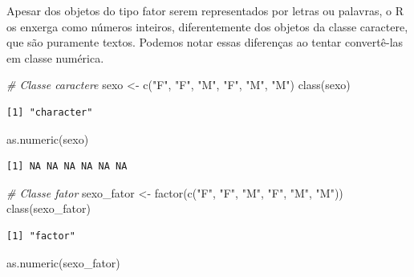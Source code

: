 \documentclass[
  brazilian,
]{book}
\newenvironment{Shaded}{\begin{snugshade}}{\end{snugshade}}
\newcommand{\CommentTok}[1]{\textcolor[rgb]{0.56,0.35,0.01}{\textit{#1}}}
\newcommand{\FunctionTok}[1]{\textcolor[rgb]{0.00,0.00,0.00}{#1}}
\newcommand{\NormalTok}[1]{#1}
\newcommand{\OtherTok}[1]{\textcolor[rgb]{0.56,0.35,0.01}{#1}}
\newcommand{\StringTok}[1]{\textcolor[rgb]{0.31,0.60,0.02}{#1}}
\begin{document}
Apesar dos objetos do tipo fator serem representados por letras ou palavras, o R os enxerga como números inteiros, diferentemente dos objetos da classe caractere, que são puramente textos. Podemos notar essas diferenças ao tentar convertê-las em classe numérica.

\begin{Shaded}
\begin{Highlighting}[]
\CommentTok{\# Classe caractere}
\NormalTok{sexo }\OtherTok{\textless{}{-}} \FunctionTok{c}\NormalTok{(}\StringTok{"F"}\NormalTok{, }\StringTok{"F"}\NormalTok{, }\StringTok{"M"}\NormalTok{, }\StringTok{"F"}\NormalTok{, }\StringTok{"M"}\NormalTok{, }\StringTok{"M"}\NormalTok{)}
\FunctionTok{class}\NormalTok{(sexo)}
\end{Highlighting}
\end{Shaded}

\begin{verbatim}
[1] "character"
\end{verbatim}

\begin{Shaded}
\begin{Highlighting}[]
\FunctionTok{as.numeric}\NormalTok{(sexo)}
\end{Highlighting}
\end{Shaded}

\begin{verbatim}
[1] NA NA NA NA NA NA
\end{verbatim}

\begin{Shaded}
\begin{Highlighting}[]
\CommentTok{\# Classe fator}
\NormalTok{sexo\_fator }\OtherTok{\textless{}{-}} \FunctionTok{factor}\NormalTok{(}\FunctionTok{c}\NormalTok{(}\StringTok{"F"}\NormalTok{, }\StringTok{"F"}\NormalTok{, }\StringTok{"M"}\NormalTok{, }\StringTok{"F"}\NormalTok{, }\StringTok{"M"}\NormalTok{, }\StringTok{"M"}\NormalTok{))}
\FunctionTok{class}\NormalTok{(sexo\_fator)}
\end{Highlighting}
\end{Shaded}

\begin{verbatim}
[1] "factor"
\end{verbatim}

\begin{Shaded}
\begin{Highlighting}[]
\FunctionTok{as.numeric}\NormalTok{(sexo\_fator)}
\end{Highlighting}
\end{Shaded}
\end{document}
